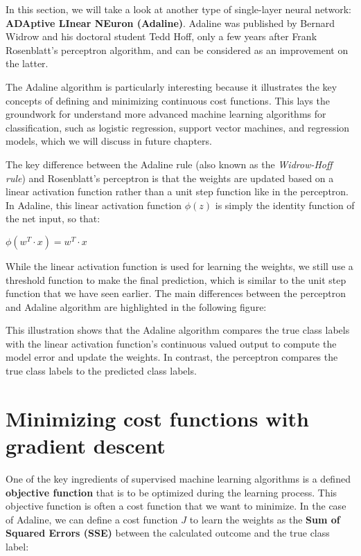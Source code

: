 \documentclass[11pt]{article}
\begin{document}
    In this section, we will take a look at another type of single-layer
neural network: \textbf{ADAptive LInear NEuron (Adaline)}. Adaline was
published by Bernard Widrow and his doctoral student Tedd Hoff, only a
few years after Frank Rosenblatt's perceptron algorithm, and can be
considered as an improvement on the latter.

    The Adaline algorithm is particularly interesting because it illustrates
the key concepts of defining and minimizing continuous cost functions.
This lays the groundwork for understand more advanced machine learning
algorithms for classification, such as logistic regression, support
vector machines, and regression models, which we will discuss in future
chapters.

    The key difference between the Adaline rule (also known as the
\emph{Widrow-Hoff rule}) and Rosenblatt's perceptron is that the weights
are updated based on a linear activation function rather than a unit
step function like in the perceptron. In Adaline, this linear activation
function \(\phi(z)\) is simply the identity function of the net input,
so that:

\(\phi(w^T \cdot x) = w^T \cdot x\)

While the linear activation function is used for learning the weights,
we still use a threshold function to make the final prediction, which is
similar to the unit step function that we have seen earlier. The main
differences between the perceptron and Adaline algorithm are highlighted
in the following figure:

    This illustration shows that the Adaline algorithm compares the true
class labels with the linear activation function's continuous valued
output to compute the model error and update the weights. In contrast,
the perceptron compares the true class labels to the predicted class
labels.

    \section{Minimizing cost functions with gradient
descent}\label{minimizing-cost-functions-with-gradient-descent}

    One of the key ingredients of supervised machine learning algorithms is
a defined \textbf{objective function} that is to be optimized during the
learning process. This objective function is often a cost function that
we want to minimize. In the case of Adaline, we can define a cost
function \(J\) to learn the weights as the \textbf{Sum of Squared Errors
(SSE)} between the calculated outcome and the true class label:
\end{document}
